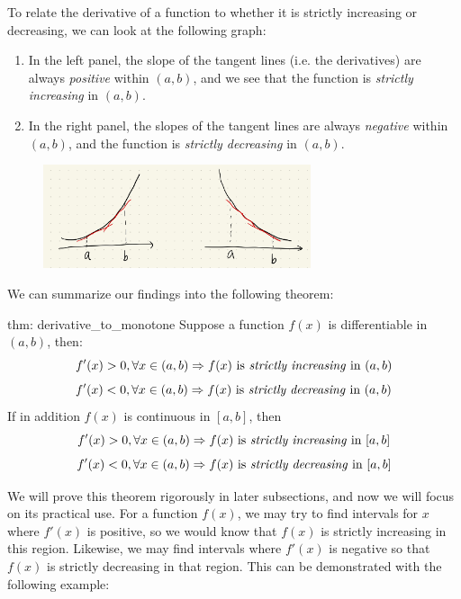 To relate the derivative of a function to whether it is strictly increasing or decreasing, we can look at the following graph:
\begin{enumerate}
    \item In the left panel, the slope of the tangent lines (i.e. the derivatives) are always \textit{positive} within $(a, b)$, and we see that the function is \textit{strictly increasing} in $(a, b)$.
    \item In the right panel, the slopes of the tangent lines are always \textit{negative} within $(a, b)$, and the function is \textit{strictly decreasing} in $(a, b)$.  
\end{enumerate}
 
\pagebreak

\begin{figure}[ht]
    \centering
    \includegraphics[width = 0.7\textwidth]{figures/chap 05/increasing_decreasing.png}
    \label{fig: increasing_decreasing}
\end{figure}

We can summarize our findings into the following theorem:

\begin{theo}{thm: derivative_to_monotone}
    Suppose a function $f(x)$ is differentiable in $(a, b)$, then:
    \[f'(x) > 0, \forall x \in (a, b) \Rightarrow f(x) \text{ is \textit{strictly increasing} in } (a,b)\]
    \[f'(x) < 0, \forall x \in (a, b) \Rightarrow f(x) \text{ is \textit{strictly decreasing} in } (a,b)\]
    If in addition $f(x)$ is continuous in $[a, b]$, then
    \[f'(x) > 0, \forall x \in (a, b) \Rightarrow f(x) \text{ is \textit{strictly increasing} in } [a,b]\]
    \[f'(x) < 0, \forall x \in (a, b) \Rightarrow f(x) \text{ is \textit{strictly decreasing} in } [a,b]\]
\end{theo}

We will prove this theorem rigorously in later subsections, and now we will focus on its practical use.  For a function $f(x)$, we may try to find intervals for $x$ where $f'(x)$ is positive, so we would know that $f(x)$ is strictly increasing in this region.  Likewise, we may find intervals where $f'(x)$ is negative so that $f(x)$ is strictly decreasing in that region.  This can be demonstrated with the following example:

